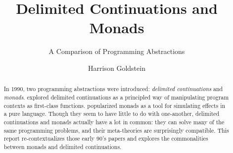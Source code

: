 \documentclass[acmsmall, nonacm, screen]{acmart}
\begin{document}
\title{Delimited Continuations and Monads}
\subtitle{A Comparison of Programming Abstractions}

\author{Harrison Goldstein}

\renewcommand{\shortauthors}{Goldstein}

\begin{abstract}
  In 1990, two programming abstractions were introduced: {\em delimited continuations} and {\em
  monads}. \citet{danvy1989functional} explored delimited continuations as a principled way of
  manipulating program contexts as first-class functions. \citet{wadler1990comprehending}
  popularized monads as a tool for simulating effects in a pure language. Though they seem to
  have little to do with one-another, delimited continuations and monads actually have a lot in
  common: they can solve many of the same programming problems, and their meta-theories are
  surprisingly compatible. This report re-contextualizes those early 90's papers and explores the
  commonalities between monads and delimited continuations.
\end{abstract}

\maketitle
\end{document}
